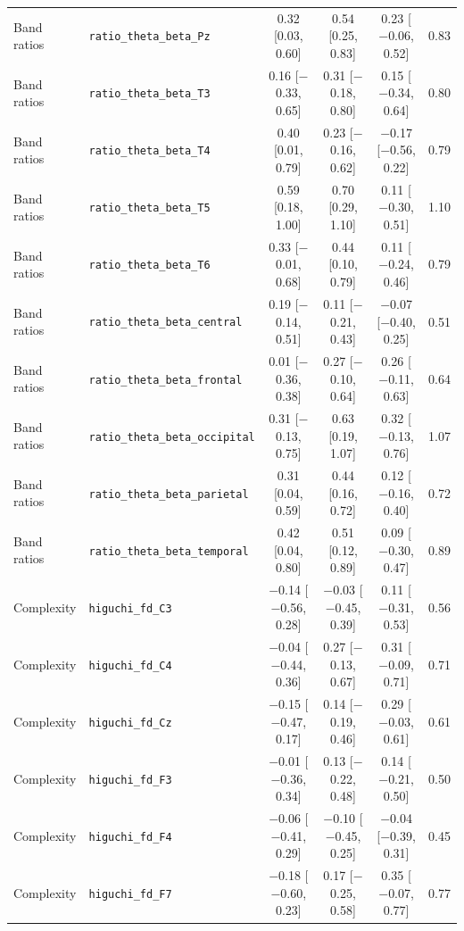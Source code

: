 {\begin{longtable}{llcccc}
Band ratios & \texttt{ratio\_theta\_beta\_Pz} & 0.32 [0.03, 0.60] & 0.54 [0.25, 0.83] & 0.23 [$-$0.06, 0.52] & 0.83 \\
Band ratios & \texttt{ratio\_theta\_beta\_T3} & 0.16 [$-$0.33, 0.65] & 0.31 [$-$0.18, 0.80] & 0.15 [$-$0.34, 0.64] & 0.80 \\
Band ratios & \texttt{ratio\_theta\_beta\_T4} & 0.40 [0.01, 0.79] & 0.23 [$-$0.16, 0.62] & $-$0.17 [$-$0.56, 0.22] & 0.79 \\
Band ratios & \texttt{ratio\_theta\_beta\_T5} & 0.59 [0.18, 1.00] & 0.70 [0.29, 1.10] & 0.11 [$-$0.30, 0.51] & 1.10 \\
Band ratios & \texttt{ratio\_theta\_beta\_T6} & 0.33 [$-$0.01, 0.68] & 0.44 [0.10, 0.79] & 0.11 [$-$0.24, 0.46] & 0.79 \\
Band ratios & \texttt{ratio\_theta\_beta\_central} & 0.19 [$-$0.14, 0.51] & 0.11 [$-$0.21, 0.43] & $-$0.07 [$-$0.40, 0.25] & 0.51 \\
Band ratios & \texttt{ratio\_theta\_beta\_frontal} & 0.01 [$-$0.36, 0.38] & 0.27 [$-$0.10, 0.64] & 0.26 [$-$0.11, 0.63] & 0.64 \\
Band ratios & \texttt{ratio\_theta\_beta\_occipital} & 0.31 [$-$0.13, 0.75] & 0.63 [0.19, 1.07] & 0.32 [$-$0.13, 0.76] & 1.07 \\
Band ratios & \texttt{ratio\_theta\_beta\_parietal} & 0.31 [0.04, 0.59] & 0.44 [0.16, 0.72] & 0.12 [$-$0.16, 0.40] & 0.72 \\
Band ratios & \texttt{ratio\_theta\_beta\_temporal} & 0.42 [0.04, 0.80] & 0.51 [0.12, 0.89] & 0.09 [$-$0.30, 0.47] & 0.89 \\
Complexity & \texttt{higuchi\_fd\_C3} & $-$0.14 [$-$0.56, 0.28] & $-$0.03 [$-$0.45, 0.39] & 0.11 [$-$0.31, 0.53] & 0.56 \\
Complexity & \texttt{higuchi\_fd\_C4} & $-$0.04 [$-$0.44, 0.36] & 0.27 [$-$0.13, 0.67] & 0.31 [$-$0.09, 0.71] & 0.71 \\
Complexity & \texttt{higuchi\_fd\_Cz} & $-$0.15 [$-$0.47, 0.17] & 0.14 [$-$0.19, 0.46] & 0.29 [$-$0.03, 0.61] & 0.61 \\
Complexity & \texttt{higuchi\_fd\_F3} & $-$0.01 [$-$0.36, 0.34] & 0.13 [$-$0.22, 0.48] & 0.14 [$-$0.21, 0.50] & 0.50 \\
Complexity & \texttt{higuchi\_fd\_F4} & $-$0.06 [$-$0.41, 0.29] & $-$0.10 [$-$0.45, 0.25] & $-$0.04 [$-$0.39, 0.31] & 0.45 \\
Complexity & \texttt{higuchi\_fd\_F7} & $-$0.18 [$-$0.60, 0.23] & 0.17 [$-$0.25, 0.58] & 0.35 [$-$0.07, 0.77] & 0.77 \\

\end{longtable}}
